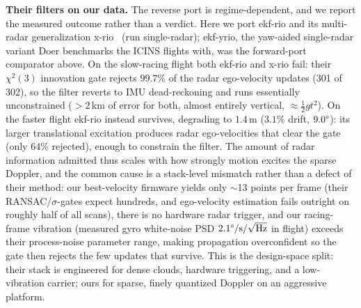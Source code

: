 \documentclass[conference]{IEEEtran}
\begin{document}
\textbf{Their filters on our data.}  The reverse port is
regime-dependent, and we report the measured outcome rather than a
verdict.  Here we port ekf-rio and its multi-radar generalization
x-rio~\cite{doer2021xrio} (run single-radar); ekf-yrio, the yaw-aided
single-radar variant Doer benchmarks the ICINS flights with, was the
forward-port comparator above.  On the slow-racing flight both ekf-rio
and x-rio fail: their
$\chi^2(3)$ innovation gate rejects $99.7\%$ of the radar ego-velocity
updates (301 of 302), so the filter reverts to IMU dead-reckoning and
runs essentially unconstrained ($>2$\,km of error for both, almost
entirely vertical, $\approx\tfrac12 g t^2$).  On the faster flight ekf-rio
instead survives, degrading to $1.4$\,m ($3.1\%$ drift,
$9.0\degree$): its larger translational excitation produces radar
ego-velocities that clear the gate (only $64\%$ rejected), enough to
constrain the filter.  The amount of radar information admitted thus
scales with how strongly motion excites the sparse Doppler, and the
common cause is a stack-level mismatch rather than a defect of their
method: our best-velocity firmware yields only $\sim$13 points per
frame (their RANSAC/$\sigma$-gates expect hundreds, and ego-velocity
estimation fails outright on roughly half of all scans), there is no
hardware radar trigger, and our racing-frame vibration (measured gyro
white-noise PSD $2.1\degree/\mathrm{s}/\sqrt{\mathrm{Hz}}$ in flight)
exceeds their process-noise parameter range, making propagation
overconfident so the gate then rejects the few updates that survive.
This is the design-space split: their stack is engineered for dense
clouds, hardware triggering, and a low-vibration carrier; ours for
sparse, finely quantized Doppler on an aggressive platform.
\end{document}
